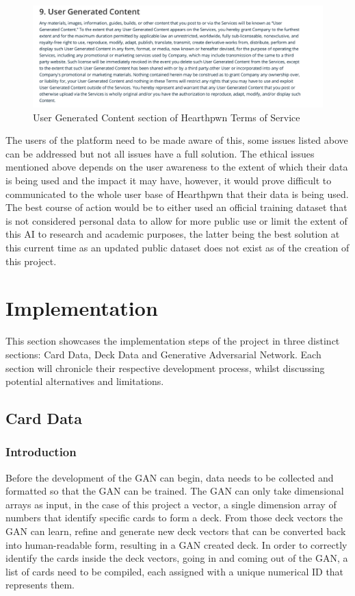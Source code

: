 \documentclass{report} %
\begin{document}
\begin{figure}[h]
\centering
\includegraphics[width=1\textwidth]{ToS}
\caption{User Generated Content section of Hearthpwn Terms of Service\protect\footnotemark}
\label{board}
\end{figure}

The users of the platform need to be made aware of this, some issues listed above can be addressed but not all issues have a full solution. The ethical issues mentioned above depends on the user awareness to the extent of which their data is being used and the impact it may have, however, it would prove difficult to communicated to the whole user base of Hearthpwn that their data is being used. The best course of action would be to either used an official training dataset that is not considered personal data to allow for more public use or limit the extent of this AI to research and academic purposes, the latter being the best solution at this current time as an updated public dataset does not exist as of the creation of this project.

\chapter{Implementation}
This section showcases the implementation steps of the project in three distinct sections: Card Data, Deck Data and Generative Adversarial Network. Each section will chronicle their respective development process, whilst discussing potential alternatives and limitations.
\section{Card Data}
\subsection{Introduction}
Before the development of the GAN can begin, data needs to be collected and formatted so that the GAN can be trained. The GAN can only take dimensional arrays as input, in the case of this project a vector, a single dimension array of numbers that identify specific cards to form a deck. From those deck vectors the GAN can learn, refine and generate new deck vectors that can be converted back into human-readable form, resulting in a GAN created deck. In order to correctly identify the cards inside the deck vectors, going in and coming out of the GAN, a list of cards need to be compiled, each assigned with a unique numerical ID that represents them. 
\end{document}
